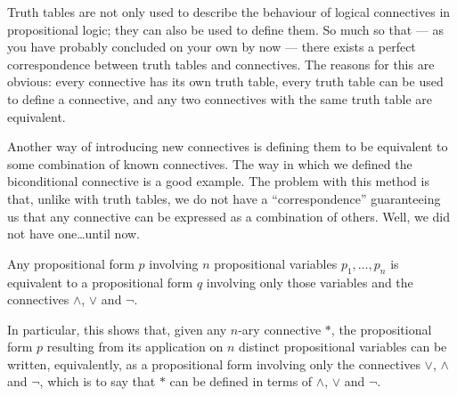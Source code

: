 \begin{para}
Truth tables are not only used to describe the behaviour of logical connectives in propositional logic; they can also be used to define them. So much so that --- as you have probably concluded on your own by now --- there exists a perfect correspondence between truth tables and connectives.
The reasons for this are obvious: every connective has its own truth table, every truth table can be used to define a connective, and any two connectives with the same truth table are equivalent.

Another way of introducing new connectives is defining them to be equivalent to some combination of known connectives.
The way in which we defined the biconditional connective is a good example.
The problem with this method is that, unlike with truth tables, we do not have a ``correspondence'' guaranteeing us that any connective can be expressed as a combination of others. Well, we did not have one\ldots until now.
\end{para}

\begin{theorem}
\label{ads1}
Any propositional form $p$ involving $n$ propositional variables $p_1,\ldots,p_n$ is equivalent to a propositional form $q$ involving only those variables and the connectives $\land$, $\lor$ and $\lnot$.

In particular, this shows that, given any $n$-ary connective $*$, the propositional form $p$ resulting from its application on $n$ distinct propositional variables can be written, equivalently, as a propositional form involving only the connectives $\lor$, $\land$ and $\lnot$, which is to say that $*$ can be defined in terms of $\land$, $\lor$ and $\lnot$.
\end{theorem}

